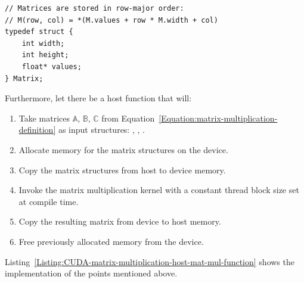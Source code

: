 \begin{lstlisting}[caption={Definition of the structure that will represent a matrix. The \code{width} variable stores the number of columns and \code{height} stores the number of rows the matrix has. The elements of the matrix are stored in row-major order in the single-precision (float) array: \code{values}. Taken from Nvidia's \emph{CUDA C++ Programming Guide} \cite{NVIDIAMay2022}.},label={Listing:CUDA-matrix-multiplication-matrix-structure-definition}]
// Matrices are stored in row-major order:
// M(row, col) = *(M.values + row * M.width + col)
typedef struct {
	int width;
	int height;
	float* values;
} Matrix;
\end{lstlisting}

Furthermore, let there be a host function  that will:

\begin{enumerate}
	\item Take matrices $ \mathbb{A} $, $ \mathbb{B} $, $ \mathbb{C} $ from Equation~\ref{Equation:matrix-multiplication-definition} as input structures: , , .
	\item Allocate memory for the matrix structures on the device.
	\item Copy the matrix structures from host to device memory.
	\item Invoke the matrix multiplication kernel with a constant thread block size set at compile time.
	\item Copy the resulting matrix from device to host memory.
	\item Free previously allocated memory from the device.
\end{enumerate}

Listing~\ref{Listing:CUDA-matrix-multiplication-host-mat-mul-function} shows the implementation of the points mentioned above.

